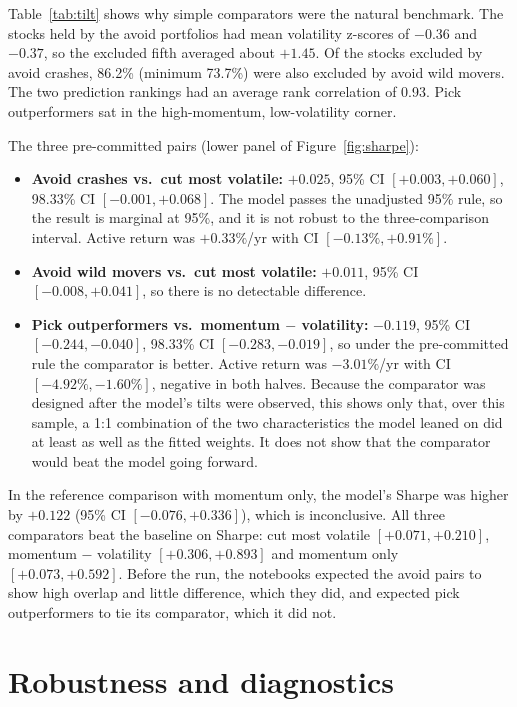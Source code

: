 \documentclass[11pt]{article}
\begin{document}
Table~\ref{tab:tilt} shows why simple comparators were the natural benchmark. The stocks held by the avoid portfolios had mean volatility z-scores of $-0.36$ and $-0.37$, so the excluded fifth averaged about $+1.45$. Of the stocks excluded by avoid crashes, 86.2\% (minimum 73.7\%) were also excluded by avoid wild movers. The two prediction rankings had an average rank correlation of 0.93. Pick outperformers sat in the high-momentum, low-volatility corner.

The three pre-committed pairs (lower panel of Figure~\ref{fig:sharpe}):
\begin{itemize}
\item \textbf{Avoid crashes vs.\ cut most volatile:} $+0.025$, 95\% CI $[+0.003, +0.060]$, 98.33\% CI $[-0.001, +0.068]$. The model passes the unadjusted 95\% rule, so the result is marginal at 95\%, and it is not robust to the three-comparison interval. Active return was $+0.33\%$/yr with CI $[-0.13\%, +0.91\%]$.
\item \textbf{Avoid wild movers vs.\ cut most volatile:} $+0.011$, 95\% CI $[-0.008, +0.041]$, so there is no detectable difference.
\item \textbf{Pick outperformers vs.\ momentum $-$ volatility:} $-0.119$, 95\% CI $[-0.244, -0.040]$, 98.33\% CI $[-0.283, -0.019]$, so under the pre-committed rule the comparator is better. Active return was $-3.01\%$/yr with CI $[-4.92\%, -1.60\%]$, negative in both halves. Because the comparator was designed after the model's tilts were observed, this shows only that, over this sample, a 1:1 combination of the two characteristics the model leaned on did at least as well as the fitted weights. It does not show that the comparator would beat the model going forward.
\end{itemize}
In the reference comparison with momentum only, the model's Sharpe was higher by $+0.122$ (95\% CI $[-0.076, +0.336]$), which is inconclusive. All three comparators beat the baseline on Sharpe: cut most volatile $[+0.071, +0.210]$, momentum $-$ volatility $[+0.306, +0.893]$ and momentum only $[+0.073, +0.592]$. Before the run, the notebooks expected the avoid pairs to show high overlap and little difference, which they did, and expected pick outperformers to tie its comparator, which it did not.

\section{Robustness and diagnostics}
\label{sec:robust}
\end{document}
